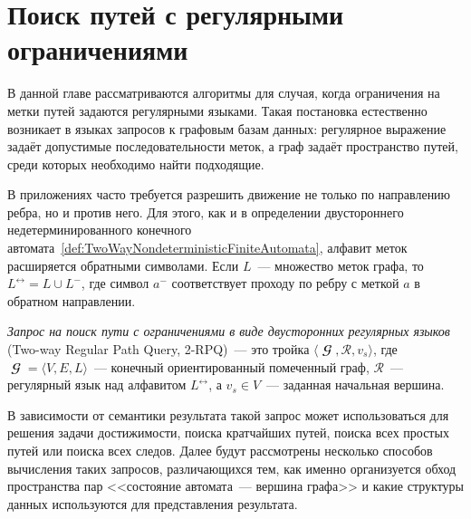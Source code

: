 \setchapterpreamble[u]{\margintoc}
\chapter{Поиск путей с регулярными ограничениями}
\label{chpt:RPQ}


В данной главе рассматриваются алгоритмы для случая, когда ограничения на метки путей задаются регулярными языками.
Такая постановка естественно возникает в языках запросов к графовым базам данных: регулярное выражение задаёт допустимые последовательности меток, а граф задаёт пространство путей, среди которых необходимо найти подходящие.

В приложениях часто требуется разрешить движение не только по направлению ребра, но и против него.
Для этого, как и в определении двустороннего недетерминированного конечного автомата~\ref{def:TwoWayNondeterministicFiniteAutomata}, алфавит меток расширяется обратными символами.
Если $L$~--- множество меток графа, то $L^{\leftrightarrow} = L \cup L^{-}$, где символ $a^{-}$ соответствует проходу по ребру с меткой $a$ в обратном направлении.

\begin{definition}
    \label{def:TwoWayRegularPathQuery}
    \emph{Запрос на поиск пути с ограничениями в виде двусторонних регулярных языков} (Two-way Regular Path Query, 2-RPQ)~--- это тройка $\langle \mbfscrG, \mathcal{R}, v_s \rangle$, где $\mbfscrG = \langle V, E, L \rangle$~--- конечный ориентированный помеченный граф, $\mathcal{R}$~--- регулярный язык над алфавитом $L^{\leftrightarrow}$, а $v_s \in V$~--- заданная начальная вершина.
\end{definition}

В зависимости от семантики результата такой запрос может использоваться для решения задачи достижимости, поиска кратчайших путей, поиска всех простых путей или поиска всех следов.
Далее будут рассмотрены несколько способов вычисления таких запросов, различающихся тем, как именно организуется обход пространства пар <<состояние автомата~--- вершина графа>> и какие структуры данных используются для представления результата.






